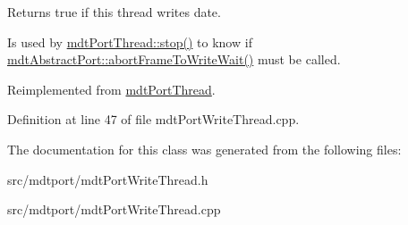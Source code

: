 Returns true if this thread writes date. 

Is used by \hyperlink{classmdt_port_thread_a5746ea96689ed80179751ad1353f0b39}{mdtPortThread::stop()} to know if \hyperlink{classmdt_abstract_port_ae67c815f68317c70e398eaa86622af6b}{mdtAbstractPort::abortFrameToWriteWait()} must be called. 

Reimplemented from \hyperlink{classmdt_port_thread_a0122a12262052cf3643241a3eaa31c58}{mdtPortThread}.



Definition at line 47 of file mdtPortWriteThread.cpp.



The documentation for this class was generated from the following files:\begin{DoxyCompactItemize}
\item 
src/mdtport/mdtPortWriteThread.h\item 
src/mdtport/mdtPortWriteThread.cpp\end{DoxyCompactItemize}
